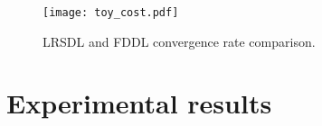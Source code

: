 \documentclass[letterpaper]{article}
\begin{document}

\vspace{-0.175in}
\begin{figure}[t]
\centering
\texttt{[image: toy\_cost.pdf]}
\caption{\small LRSDL and FDDL convergence rate comparison. }
\label{fig:lrsdlfddlcompare}
\end{figure}

\section{Experimental results} %
\vspace{-0.1in}
\label{sec:experiment_results}
\end{document}
